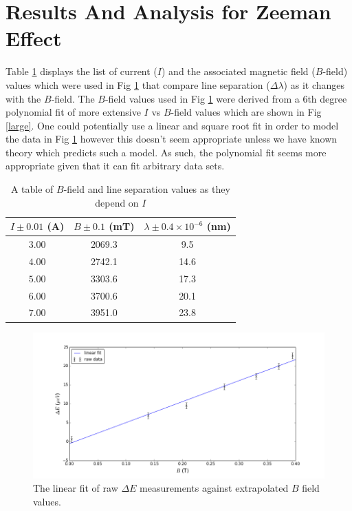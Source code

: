 \documentclass[prb,preprint]{revtex4-1}
\begin{document}
\section{Results And Analysis for Zeeman Effect}

Table \ref{energies} displays the list of current ($I$) and the associated magnetic field ($B$-field) values which were used in Fig \ref{diff} that compare line separation ($\Delta \lambda$) as it changes with the $B$-field. The $B$-field values used in Fig \ref{diff} were derived from a 6th degree polynomial fit of more extensive $I$ vs $B$-field values which are shown in Fig \ref{large}. One could potentially use a linear and square root fit in order to model the data in Fig \ref{diff} however this doesn't seem appropriate unless we have known theory which predicts such a model. As such, the polynomial fit seems more appropriate given that it can fit arbitrary data sets.

\begin{table}[h]
\caption{A table of $B$-field and line separation values as they depend on $I$}
\begin{ruledtabular}
\begin{tabular}{c c c}
$I\pm0.01$ (A) & $B\pm0.1$ (mT) & $\lambda \pm 0.4 \times10^{-6}$ (nm)\\
\hline
$3.00$& 2069.3 & 9.5\\
$4.00$& 2742.1 & 14.6\\
$5.00$& 3303.6 & 17.3\\
$6.00$& 3700.6 & 20.1\\
$7.00$& 3951.0 & 23.8\\
\end{tabular}
\end{ruledtabular}
\label{energies}
\end{table}

\begin{figure}[h]
\centering
\includegraphics[width=\textwidth]{deltE_v_B.png}
\caption{The linear fit of raw $\Delta E$ measurements against extrapolated $B$ field values.}
\label{diff}
\end{figure}
\end{document}

